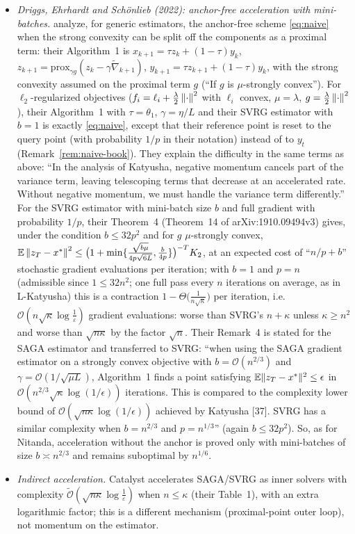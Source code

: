 \begin{itemize}
\item \emph{Driggs, Ehrhardt and Sch\"onlieb (2022): anchor-free acceleration with mini-batches.} \cite{driggs2022accelerating} analyze, for generic estimators, the anchor-free scheme \eqref{eq:naive} when the strong convexity can be split off the components as a proximal term: their Algorithm~1 is $x_{k+1}=\tau z_k+(1-\tau)y_k$, $z_{k+1}=\mathrm{prox}_{\gamma g}(z_k-\gamma\tilde\nabla_{k+1})$, $y_{k+1}=\tau z_{k+1}+(1-\tau)y_k$, with the strong convexity assumed on the proximal term $g$ (``If $g$ is $\mu$-strongly convex''). For $\ell_2$-regularized objectives ($f_i=\ell_i+\frac\lambda2\left\|\cdot\right\|^2$ with $\ell_i$ convex, $\mu=\lambda$, $g=\frac\lambda2\left\|\cdot\right\|^2$), their Algorithm~1 with $\tau=\theta_1$, $\gamma=\eta/L$ and their SVRG estimator with $b=1$ is exactly \eqref{eq:naive}, except that their reference point is reset to the query point (with probability $1/p$ in their notation) instead of to $y_t$ (Remark~\ref{rem:naive-book}). They explain the difficulty in the same terms as above: ``In the analysis of Katyusha, negative momentum cancels part of the variance term, leaving telescoping terms that decrease at an accelerated rate. Without negative momentum, we must handle the variance term differently.'' For the SVRG estimator with mini-batch size $b$ and full gradient with probability $1/p$, their Theorem~4 (Theorem~14 of arXiv:1910.09494v3) gives, under the condition $b\le32p^2$ and for $g$ $\mu$-strongly convex, $\mathbb{E}\left\|z_T-x^\ast\right\|^2\le\big(1+\min\{\frac{\sqrt{b\mu}}{4p\sqrt{6L}},\frac b{4p}\}\big)^{-T}K_2$, at an expected cost of ``$n/p+b$'' stochastic gradient evaluations per iteration; with $b=1$ and $p=n$ (admissible since $1\le32n^2$; one full pass every $n$ iterations on average, as in L-Katyusha) this is a contraction $1-\Theta\big(\frac1{n\sqrt{\kappa}}\big)$ per iteration, i.e.\ $\mathcal O(n\sqrt\kappa\log\frac1\varepsilon)$ gradient evaluations: worse than SVRG's $n+\kappa$ unless $\kappa\ge n^2$ and worse than $\sqrt{n\kappa}$ by the factor $\sqrt n$. Their Remark~4 is stated for the SAGA estimator and transferred to SVRG: ``when using the SAGA gradient estimator on a strongly convex objective with $b=\mathcal O(n^{2/3})$ and $\gamma=\mathcal O(1/\sqrt{\mu L})$, Algorithm~1 finds a point satisfying $\mathbb{E}\|z_T-x^\ast\|^2\le\epsilon$ in $\mathcal O(n^{2/3}\sqrt\kappa\log(1/\epsilon))$ iterations. This is compared to the complexity lower bound of $\mathcal O(\sqrt{n\kappa}\log(1/\epsilon))$ achieved by Katyusha [37]. SVRG has a similar complexity when $b=n^{2/3}$ and $p=n^{1/3}$'' (again $b\le32p^2$). So, as for Nitanda, acceleration without the anchor is proved only with mini-batches of size $b\asymp n^{2/3}$ and remains suboptimal by $n^{1/6}$.
\item \emph{Indirect acceleration.} Catalyst \cite{lin2015universal} accelerates SAGA/SVRG as inner solvers with complexity $\tilde{\mathcal O}(\sqrt{n\kappa}\log\frac1\varepsilon)$ when $n\le\kappa$ (their Table~1), with an extra logarithmic factor; this is a different mechanism (proximal-point outer loop), not momentum on the estimator.
\end{itemize}
